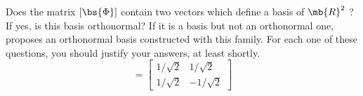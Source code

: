 \bexo


Does the matrix $[\bs{\Phi}]$ contain  two vectors which define a basis of $\mb{R}^2$ ? If yes, is this basis orthonormal? If it is a basis but not an orthonormal one, proposes an orthonormal basis constructed with this family. For each one of these questions, you should justify your answers, at least shortly.
\begin{equation}
	[\bs{\Phi}]=\begin{bmatrix}
		{1/\sqrt{2}} & {1/\sqrt{2}} \\
		{1/\sqrt{2}} & {-1/\sqrt{2}}
	\end{bmatrix}
\end{equation}
\eexo
\solution{
 

}